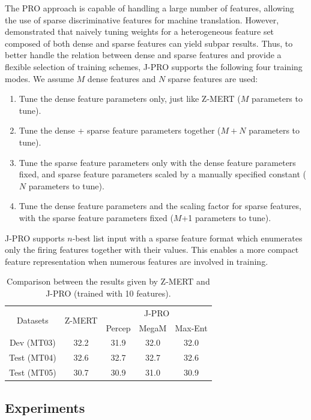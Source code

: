 \documentclass[11pt]{article}
\begin{document}
The PRO approach is capable of handling a large number of features,
allowing the use of sparse discriminative features for machine
translation.  However,  demonstrated that naively
tuning weights for a heterogeneous feature set composed of both dense
and sparse features can yield subpar results. Thus, to better handle
the relation between dense and sparse features and provide a flexible
selection of training schemes, J-PRO supports the following four
training modes. We assume $M$ dense features and $N$ sparse features
are used:
\begin{enumerate}
\item Tune the dense feature parameters only, just like Z-MERT ($M$
  parameters to tune).
\item Tune the dense + sparse feature parameters together ($M+N$
  parameters to tune).
\item Tune the sparse feature parameters only with the dense feature
  parameters fixed, and sparse feature parameters scaled by a manually
  specified constant ($N$ parameters to tune).
\item Tune the dense feature parameters and the scaling factor for
  sparse features, with the sparse feature parameters fixed ($M$+1
  parameters to tune).
\end{enumerate}
J-PRO supports $n$-best list input with a sparse feature format which
enumerates only the firing features together with their values. This
enables a more compact feature representation when numerous features
are involved in training.

\begin{table}[!t]
\centering
\begin{tabular}{|c|c|c|c|c|}
  \hline
  \multirow{2}{*}{Datasets} & \multirow{2}{*}{Z-MERT} & \multicolumn{3}{c|}{J-PRO} \\
  &       & Percep & MegaM & Max-Ent\\
  \hline\hline
  Dev (MT03)   &32.2  &31.9  &32.0  &32.0 \\
  Test (MT04)  &32.6  &32.7  &32.7  &32.6 \\
  Test (MT05)  &30.7  &30.9  &31.0  &30.9 \\
  \hline
\end{tabular}
\caption{\label{table:pro} Comparison between the results given by
  Z-MERT and J-PRO (trained with 10 features).}
\end{table}

\subsection{Experiments}
\end{document}
